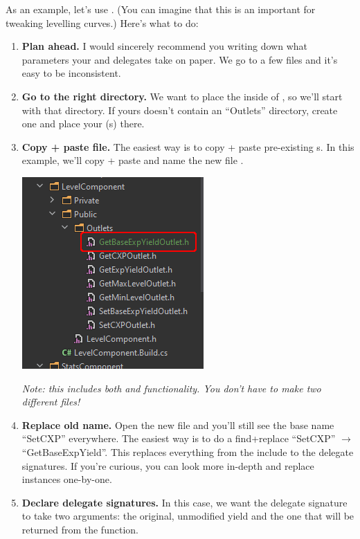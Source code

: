 As an example, let's use . (You can imagine that this is an important  for tweaking levelling curves.) Here's what to do:\\

\begin{enumerate}
	\item{\textbf{Plan ahead.} I would sincerely recommend you writing down what parameters your   and  delegates take on paper. We go to a few files and it's easy to be inconsistent.}
	\item{\textbf{Go to the right directory.} We want to place the  inside of , so we'll start with that directory. If yours doesn't contain an ``Outlets'' directory, create one and place your (s) there.}
	\item{\textbf{Copy + paste file.} The easiest way is to copy + paste pre-existing s. In this example, we'll copy + paste  and name the new file . \\
	\begin{center}
		\includegraphics[scale=\ScreenshotScale]{create-outlet-rename}
	\end{center}
	\noindent \textit{Note: this includes both  and  functionality. You don't have to make two different files!}
	}
	\item{\textbf{Replace old name.} Open the new file and you'll still see the base name ``SetCXP'' everywhere. The easiest way is to do a find+replace ``SetCXP'' $\rightarrow$ ``GetBaseExpYield''. This replaces everything from the  include to the delegate signatures. If you're curious, you can look more in-depth and replace instances one-by-one.}
	\item{\textbf{Declare delegate signatures.} In this case, we want the  delegate signature to take two arguments: the original, unmodified yield and the one that will be returned from the  function.\\
}
\end{enumerate}
